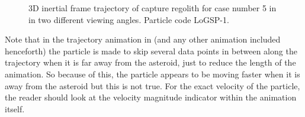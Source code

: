 \begin{figure}[htb]
\centering
\captionsetup{justification=centering}
\caption{3D inertial frame trajectory of capture regolith for case number 5 in  in two different viewing angles. Particle code LoGSP-1.}
\label{fig:LoGSP_1_capture_case_5_3d_traj_inertialFrame_differnetViews}
\end{figure}
\FloatBarrier
Note that in the trajectory animation in  (and any other animation included henceforth) the particle is made to skip several data points in between along the trajectory when it is far away from the asteroid, just to reduce the length of the animation. So because of this, the particle appears to be moving faster when it is away from the asteroid but this is not true. For the exact velocity of the particle, the reader should look at the velocity magnitude indicator within the animation itself.
